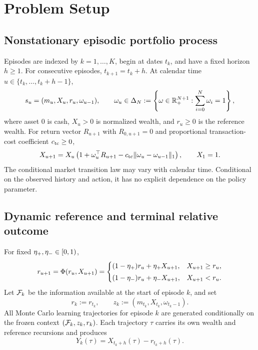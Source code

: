 \section{Problem Setup}\label{sec:setup}

\subsection{Nonstationary episodic portfolio process}

Episodes are indexed by $k=1,\ldots,K$, begin at dates $t_k$, and have a fixed horizon $h\ge1$.  For consecutive episodes, $t_{k+1}=t_k+h$.  At calendar time $u\in\{t_k,\ldots,t_k+h-1\}$,
\begin{equation}\label{eq:state-action}
 s_u=(m_u,X_u,r_u,\omega_{u-1}),
 \qquad
 \omega_u\in\Delta_N:=\left\{\omega\in\mathbb R_+^{N+1}:\sum_{i=0}^{N}\omega_i=1\right\},
\end{equation}
where asset $0$ is cash, $X_u>0$ is normalized wealth, and $r_u\ge0$ is the reference wealth.  For return vector $R_{u+1}$ with $R_{0,u+1}=0$ and proportional transaction-cost coefficient $c_{\rm tc}\ge0$,
\begin{equation}\label{eq:wealth-update}
 X_{u+1}=X_u\left(1+\omega_u^\top R_{u+1}
 -c_{\rm tc}\lVert\omega_u-\omega_{u-1}\rVert_1\right),
 \qquad X_1=1.
\end{equation}
The conditional market transition law may vary with calendar time.  Conditional on the observed history and action, it has no explicit dependence on the policy parameter.

\subsection{Dynamic reference and terminal relative outcome}

For fixed $\eta_{+},\eta_{-}\in[0,1)$,
\begin{equation}\label{eq:reference-update}
 r_{u+1}=\Phi(r_u,X_{u+1})
 =\begin{cases}
 (1-\eta_{+})r_u+\eta_{+} X_{u+1}, & X_{u+1}\ge r_u,\\[1mm]
 (1-\eta_{-})r_u+\eta_{-} X_{u+1}, & X_{u+1}<r_u.
 \end{cases}
\end{equation}
Let $\mathcal F_k$ be the information available at the start of episode $k$, and set
\begin{equation}\label{eq:start-context}
 r_k:=r_{t_k},
 \qquad
 z_k:=(m_{t_k},X_{t_k},\omega_{t_k-1}).
\end{equation}
All Monte Carlo learning trajectories for episode $k$ are generated conditionally on the frozen context $(\mathcal F_k,z_k,r_k)$.  Each trajectory $\tau$ carries its own wealth and reference recursions and produces
\begin{equation}\label{eq:relative-outcome}
 Y_k(\tau)=X_{t_k+h}(\tau)-r_{t_k+h}(\tau).
\end{equation}

